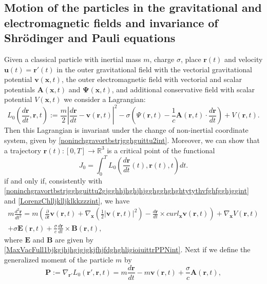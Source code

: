 \documentclass{article}
\theoremstyle{definition}
\theoremstyle{remark}
\renewcommand{\vec}[1]{\mathbf{#1}}
\newcommand{\er}{\eqref}
\newcommand{\er}{\eqref}
\begin{document}
\subsection{Motion of the particles in the gravitational and electromagnetic fields and invariance of Shr\"{o}dinger and Pauli equations}
Given a classical particle with inertial mass $m$, charge $\sigma$,
place $\vec r(t)$ and velocity $\vec u(t)=\vec r'(t)$ in the outer
gravitational field with the vectorial gravitational potential $\vec
v(\vec x,t)$, the outer electromagnetic field with vectorial and
scalar potentials $\vec A(\vec x,t)$ and $\vec \Psi(\vec x,t)$, and
additional conservative field with scalar potential $V(\vec x,t)$ we
consider a Lagrangian:
\begin{equation}\label{vhfffngghkjgghfjjint}
L_0\left(\frac{d\vec r}{dt},\vec
r,t\right):=\frac{m}{2}\left|\frac{d\vec r}{dt}-\vec v(\vec
r,t)\right|^2-\sigma\left(\Psi(\vec r,t)-\frac{1}{c}\vec A(\vec
r,t)\cdot\frac{d\vec r}{dt}\right)+V(\vec r,t).
\end{equation}
Then this Lagrangian is invariant under the change of non-inertial
coordinate system, given by \er{noninchgravortbstrjgghguittu2int}.
Moreover, we can show that a trajectory $\vec
r(t):[0,T]\to\mathbb{R}^3$ is a critical point of the functional
\begin{equation}\label{btfffygtgyggyijhhkkint}
J_0=\int_0^T L_0\left(\frac{d\vec r}{dt}(t),\vec r(t),t\right)dt.
\end{equation}
if and only if, consistently with
\er{noninchgravortbstrjgghguittu2gjgghhjhghjhjgghgghghghtytythvfghfgghjggint}
and \er{LorenzChlljklljklkkzzzint}, we have
\begin{multline}\label{vhfffngghkjgghggtghjgfhjoyuiyuyhiyyukukyihyuint}
m\frac{d^2\vec r}{dt^2}=m\left(\frac{\partial}{\partial t}\vec
v(\vec r,t)+\nabla_{\vec x}\left(\frac{1}{2}\left|\vec v(\vec
r,t)\right|^2\right)-\frac{d\vec r}{dt}\times curl_{\vec x}\vec
v(\vec r,t)\right)+\nabla_{\vec x}V\left(\vec
r,t\right)\\+\sigma\vec E(\vec r,t)+\frac{\sigma}{c}\frac{d\vec
r}{dt}\times \vec B(\vec r,t),
\end{multline}
where $\vec E$ and $\vec B$ are given by
\er{MaxVacFull1bjkgjhjhgjgjgkjfhjfdghghligioiuittrPPNint}.
Next if we define the
generalized moment of the particle $m$ by
\begin{equation}\label{guytyurtydftyiujhint}
\vec P:=\nabla_{\vec r'}L_0\left(\vec r',\vec r,t\right)=m
\frac{d\vec r}{dt}-m\vec v(\vec r,t)+\frac{\sigma}{c}\vec A(\vec
r,t),
\end{equation}
\end{document}
